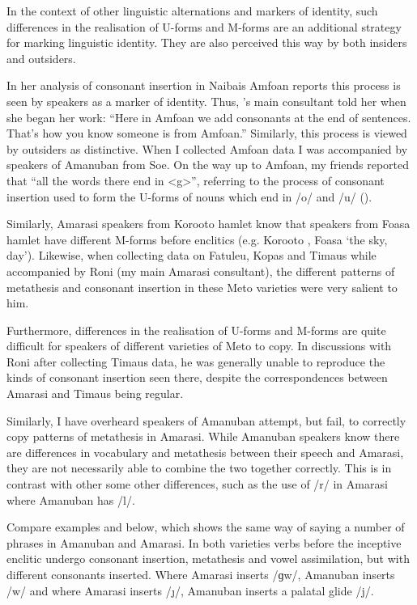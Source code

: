 In the context of other linguistic alternations and markers of identity,
such differences in the realisation of U-forms and M-forms
are an additional strategy for marking linguistic identity.
They are also perceived this way by both insiders and outsiders.

In her analysis of consonant insertion in Nai{\Q}bais Amfo{\Q}an
\cite{cu18} reports this process is seen by
speakers as a marker of identity.
Thus, \citeauthor{cu18}'s main consultant told her when she began her work:
{``Here in Amfo{\Q}an we add consonants at the end of sentences.
That's how you know someone is from Amfo{\Q}an.''}
Similarly, this process is viewed by outsiders as distinctive.
When I collected Amfo{\Q}an data I was accompanied
by speakers of Amanuban from So{\Q}e.
On the way up to Amfo{\Q}an, my friends reported
that ``all the words there end in <g>'',
referring to the process of consonant insertion used to form the U-forms
of nouns which end in /o/ and /u/ ().

Similarly, Amarasi speakers from Koro{\Q}oto
hamlet know that speakers from Fo{\Q}asa{\Q} hamlet have different M-forms before enclitics
(e.g. Koro{\Q}oto , Fo{\Q}asa{\Q}  `the sky, day').
Likewise, when collecting data on Fatule{\Q}u, Kopas and Timaus while accompanied
by Roni (my main Amarasi consultant), the different patterns
of metathesis and consonant insertion in these
Meto varieties were very salient to him.

Furthermore, differences in the realisation of U-forms and M-forms
are quite difficult for speakers of different varieties of Meto to copy.
In discussions with Roni after collecting Timaus data, he was generally unable to reproduce
the kinds of consonant insertion seen there, despite the correspondences
between Amarasi and Timaus being regular.

Similarly, I have overheard speakers of Amanuban
attempt, but fail, to correctly copy patterns of metathesis in Amarasi.
While Amanuban speakers know there are differences in
vocabulary and metathesis between their speech and Amarasi,
they are not necessarily able to combine the two together correctly.
This is in contrast with other some other differences,
such as the use of /r/ in Amarasi where Amanuban has /l/.

Compare examples  and  below,
which shows the same way of saying a number of phrases in Amanuban and Amarasi.
In both varieties verbs before the inceptive enclitic  undergo consonant insertion,
metathesis and vowel assimilation, but with different consonants inserted.
Where Amarasi inserts /ɡw/, Amanuban inserts /w/
and where Amarasi inserts /\j/, Amanuban inserts a palatal glide /j/.

